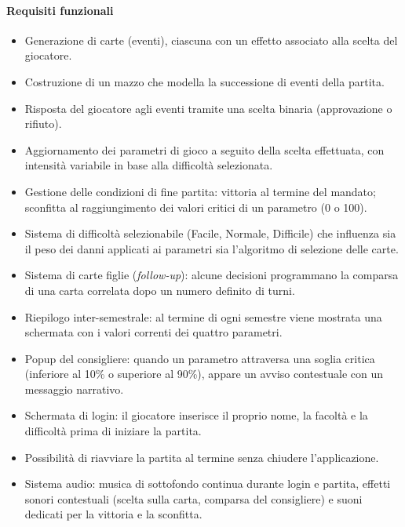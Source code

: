 \documentclass[11pt, a4paper, oneside]{report}
\begin{document}
\paragraph{Requisiti funzionali}
\begin{itemize}
    \item Generazione di carte (eventi), ciascuna con un effetto associato 
          alla scelta del giocatore.
    \item Costruzione di un mazzo che modella la successione di eventi 
          della partita.
    \item Risposta del giocatore agli eventi tramite una scelta binaria 
          (approvazione o rifiuto).
    \item Aggiornamento dei parametri di gioco a seguito della scelta 
          effettuata, con intensità variabile in base alla difficoltà 
          selezionata.
    \item Gestione delle condizioni di fine partita: vittoria al termine 
          del mandato; sconfitta al raggiungimento dei valori critici di 
          un parametro (0 o 100).
    \item Sistema di difficoltà selezionabile (Facile, Normale, Difficile) 
          che influenza sia il peso dei danni applicati ai parametri sia 
          l'algoritmo di selezione delle carte.
    \item Sistema di carte figlie (\emph{follow-up}): alcune decisioni 
          programmano la comparsa di una carta correlata dopo un numero 
          definito di turni.
    \item Riepilogo inter-semestrale: al termine di ogni semestre viene 
          mostrata una schermata con i valori correnti dei quattro parametri.
    \item Popup del consigliere: quando un parametro attraversa una soglia 
          critica (inferiore al 10\% o superiore al 90\%), appare un avviso 
          contestuale con un messaggio narrativo.
    \item Schermata di login: il giocatore inserisce il proprio nome, 
          la facoltà e la difficoltà prima di iniziare la partita.
    \item Possibilità di riavviare la partita al termine senza chiudere 
          l'applicazione.
    \item Sistema audio: musica di sottofondo continua durante login 
          e partita, effetti sonori contestuali (scelta sulla carta, 
          comparsa del consigliere) e suoni dedicati per la vittoria 
          e la sconfitta.
\end{itemize}
\end{document}
